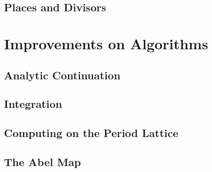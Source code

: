 \subsection{Places and Divisors}


\section{Improvements on
  Algorithms}\label{sec:abelfunctions-improvements-on-algorithms}


\subsection{Analytic
  Continuation}\label{subsec:abelfunctions-analytic-continuation}


\subsection{Integration}\label{subsec:abelfunctions-integration}


\subsection{Computing on the Period
  Lattice}\label{subsec:abelfunctions-period-lattice}


\subsection{The Abel Map}\label{subsec:abelfunctions-abel-map}


